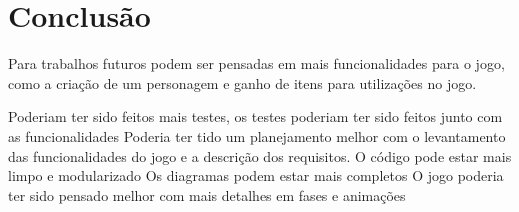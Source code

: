 \chapter[Conclusão]{Conclusão}
Para trabalhos futuros podem ser pensadas em mais funcionalidades para o jogo, como a criação de um personagem e ganho de itens para utilizações no jogo.

Poderiam ter sido feitos mais testes, os testes poderiam ter sido feitos junto com as funcionalidades
Poderia ter tido um planejamento melhor com o levantamento das funcionalidades do jogo e a descrição dos requisitos.
O código pode estar mais limpo e modularizado
Os diagramas podem estar mais completos
O jogo poderia ter sido pensado melhor com mais detalhes em fases e animações
